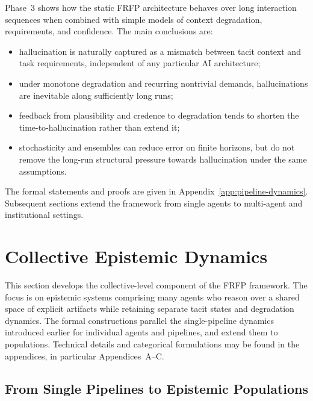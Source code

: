 \documentclass[11pt]{article}
\theoremstyle{definition}
\begin{document}
Phase~3 shows how the static FRFP architecture behaves over long
interaction sequences when combined with simple models of context
degradation, requirements, and confidence. The main conclusions are:
\begin{itemize}[leftmargin=2em]
  \item hallucination is naturally captured as a mismatch between tacit
        context and task requirements, independent of any particular AI
        architecture;
  \item under monotone degradation and recurring nontrivial demands,
        hallucinations are inevitable along sufficiently long runs;
  \item feedback from plausibility and credence to degradation tends to
        shorten the time-to-hallucination rather than extend it;
  \item stochasticity and ensembles can reduce error on finite horizons,
        but do not remove the long-run structural pressure towards
        hallucination under the same assumptions.
\end{itemize}

The formal statements and proofs are given in
Appendix~\ref{app:pipeline-dynamics}. Subsequent sections extend the
framework from single agents to multi-agent and institutional settings.

\section{Collective Epistemic Dynamics}
\label{sec:collective-epistemic-dynamics}

This section develops the collective-level component of the FRFP framework.
The focus is on epistemic systems comprising many agents who reason over a
shared space of explicit artifacts while retaining separate tacit states and
degradation dynamics. The formal constructions parallel the single-pipeline
dynamics introduced earlier for individual agents and pipelines, and extend
them to populations. Technical details and categorical formulations may be
found in the appendices, in particular Appendices~A--C.

\subsection{From Single Pipelines to Epistemic Populations}
\end{document}
